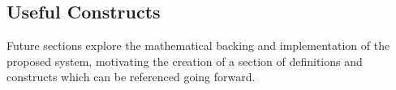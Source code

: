 \subsection{Useful Constructs}

Future sections explore the mathematical backing and implementation of the proposed system, motivating the creation of a section of definitions and constructs which can be referenced going forward.

\subsubsection{}